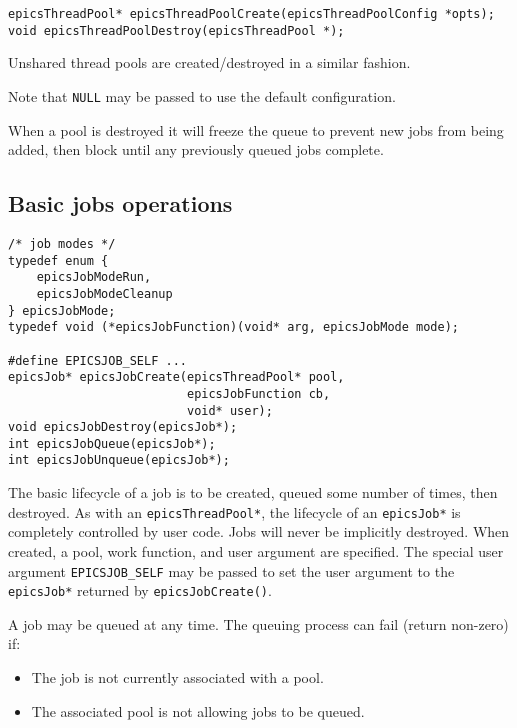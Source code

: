 \begin{verbatim}
epicsThreadPool* epicsThreadPoolCreate(epicsThreadPoolConfig *opts);
void epicsThreadPoolDestroy(epicsThreadPool *);
\end{verbatim}



Unshared thread pools are created/destroyed in a similar fashion.

Note that \verb|NULL| may be passed to use the default configuration.

When a pool is destroyed it will freeze the queue to prevent new jobs
from being added, then block until any previously queued jobs complete.

\subsection{Basic jobs operations}

\begin{verbatim}
/* job modes */
typedef enum {
    epicsJobModeRun,
    epicsJobModeCleanup
} epicsJobMode;
typedef void (*epicsJobFunction)(void* arg, epicsJobMode mode);

#define EPICSJOB_SELF ...
epicsJob* epicsJobCreate(epicsThreadPool* pool,
                         epicsJobFunction cb,
                         void* user);
void epicsJobDestroy(epicsJob*);
int epicsJobQueue(epicsJob*);
int epicsJobUnqueue(epicsJob*);
\end{verbatim}



The basic lifecycle of a job is to be created, queued some number of
times, then destroyed. As with an \verb|epicsThreadPool*|, the lifecycle of
an \verb|epicsJob*| is completely controlled by user code. Jobs will never
be implicitly destroyed. When created, a pool, work function, and
user argument are specified. The special user argument \verb|EPICSJOB_SELF|
may be passed to set the user argument to the \verb|epicsJob*| returned
by \verb|epicsJobCreate()|.

A job may be queued at any time. The queuing process can fail (return
non-zero) if:

\begin{itemize}
\item The job is not currently associated with a pool.
\item The associated pool is not allowing jobs to be queued.
\end{itemize}


